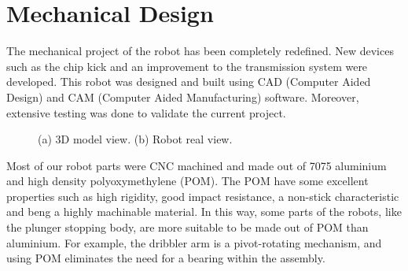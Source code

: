 \section{Mechanical Design}

The mechanical project of the robot has been completely redefined. New devices such as the chip kick and an improvement to the transmission system were developed. This robot was designed and built using CAD (Computer Aided Design) and CAM (Computer Aided Manufacturing) software. Moreover, extensive testing was done to validate the current project.

\begin{figure}[thpb]
	\centering
	\caption{(a) 3D model view. (b) Robot real view.}
	\label{mec1}
\end{figure}

Most of our robot parts were CNC machined and made out of 7075 aluminium and high density polyoxymethylene (POM). The POM have some excellent properties such as high rigidity, good impact resistance,
a non-stick characteristic and beng a highly machinable material. In this way, some parts of the robots, like the plunger stopping body, are more suitable to be made out of POM than aluminium. For example, the dribbler arm is a pivot-rotating mechanism, and using POM eliminates the need for a bearing within the assembly.

